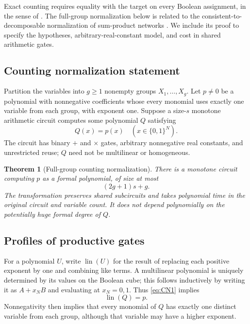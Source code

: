 \documentclass[11pt]{article}
\newtheorem{theorem}{Theorem}[section]
\theoremstyle{definition}
\theoremstyle{remark}
\numberwithin{equation}{section}
\begin{document}
Exact counting requires equality with the target on every Boolean
assignment, in the sense of \cite{Jukna2016}. The full-group normalization
below is related to the consistent-to-decomposable normalization
of sum-product networks \cite{Peharz2015,MartensMedabalimi2015}.
We include its proof to specify the hypotheses, arbitrary-real-constant
model, and cost in shared arithmetic gates.

\subsection{Counting normalization statement}

Partition the variables into \(g\ge1\) nonempty groups
\(X_1,\ldots,X_g\). Let \(p\ne0\) be a polynomial with nonnegative
coefficients whose every monomial uses exactly one variable from
each group, with exponent one. Suppose a size-\(s\) monotone
arithmetic circuit computes some polynomial \(Q\) satisfying
\begin{equation}\label{eq:CN1}
Q(x)=p(x)\quad(x\in\{0,1\}^N).
\end{equation}
The circuit has binary \(+\) and \(\times\) gates, arbitrary
nonnegative real constants, and unrestricted reuse; \(Q\) need
not be multilinear or homogeneous.

\begin{theorem}[Full-group counting normalization]\label{thm:counting} There is a monotone circuit computing
\(p\) as a formal polynomial, of size at most
\begin{equation}\label{eq:CN2}
(2g+1)s+g.
\end{equation}
The transformation preserves shared subcircuits and takes
polynomial time in the original circuit and variable count.
It does not depend polynomially on the potentially huge formal
degree of \(Q\).
\end{theorem}

\subsection{Profiles of productive gates}

For a polynomial \(U\), write \(\operatorname{lin}(U)\) for
the result of replacing each positive exponent by one and
combining like terms. A multilinear polynomial is uniquely
determined by its values on the Boolean cube; this follows
inductively by writing it as \(A+x_NB\) and evaluating at
\(x_N=0,1\). Thus \eqref{eq:CN1} implies
\begin{equation}\label{eq:CN3}
\operatorname{lin}(Q)=p.
\end{equation}
Nonnegativity then implies that every monomial of \(Q\) has
exactly one distinct variable from each group, although that
variable may have a higher exponent.
\end{document}
